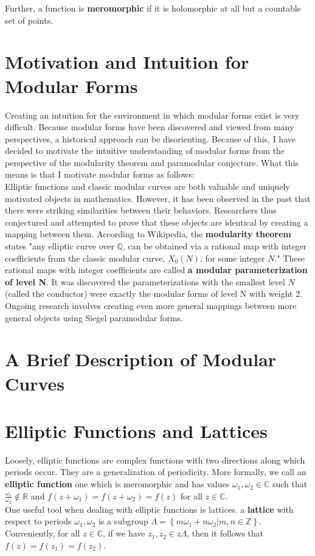 \documentclass[11pt, oneside]{amsart}
\begin{document}
Further, a function is \textbf{meromorphic} if it is holomorphic at all but a countable set of points.

\section{Motivation and Intuition for Modular Forms}
Creating an intuition for the environment in which modular forms exist is very difficult. Because modular forms have been discovered and viewed from many perspectives, a historical approach can be disorienting. Because of this, I have decided to motivate the intuitive understanding of modular forms from the perspective of the modularity theorem and paramodular conjecture. What this means is that I motivate modular forms as follows:\\
Elliptic functions and classic modular curves are both valuable and uniquely motivated objects in mathematics. However, it has been observed in the past that there were striking similarities between their behaviors. Researchers thus conjectured and attempted to prove that these objects are identical by creating a mapping between them. According to Wikipedia, the \textbf{modularity theorem} states "any elliptic curve over $\mathbb{Q}$, can be obtained via a rational map with integer coefficients from the classic modular curve, $X_{0}(N)$, for some integer $N$." These rational maps with integer coefficients are called \textbf{a modular parameterization of level N}. It was discovered the parameterizations with the smallest level $N$ (called the conductor) were exactly the modular forms of level N with weight 2. Ongoing research involves creating even more general mappings between more general objects using Siegel paramodular forms.
\section{A Brief Description of Modular Curves}

\section{Elliptic Functions and Lattices}
Loosely, elliptic functions are complex functions with two directions along which periods occur. They are a generalization of periodicity. More formally, we call an \textbf{elliptic function} one which is meromorphic and has values $\omega_1, \omega_2 \in \mathbb{C}$ such that $\frac{\omega_1}{\omega_2} \not\in \mathbb{R}$ and $f(z+\omega_1) =f(z+\omega_2)=f(z)$ for all $z\in \mathbb{C}$.\\
One useful tool when dealing with elliptic functions is lattices. a \textbf{lattice} with respect to periods $\omega_1, \omega_2$ is a subgroup $\Lambda=\left\{m \omega_{1}+n \omega_{2} | m, n \in \mathbb{Z}\right\}$. Conveniently, for all $z\in\mathbb{C}$, if we have  $z_1,z_2\in z\Lambda$, then it follows that $f(z)=f(z_1)=f(z_2)$.\\
\end{document}
